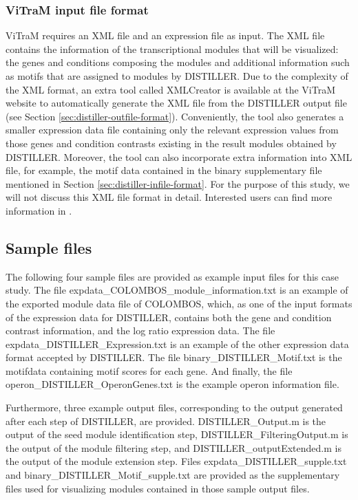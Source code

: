 \subsubsection{ViTraM input file format}
ViTraM requires an XML file and an expression file as input. The XML file contains the information of the transcriptional modules that will be visualized: the genes and conditions composing the modules and additional information such as motifs that are assigned to modules by DISTILLER. Due to the complexity of the XML format, an extra tool called XMLCreator is available at the ViTraM website to automatically generate the XML file from the DISTILLER output file (see Section \ref{sec:distiller-outfile-format}).  Conveniently, the tool also generates a smaller expression data file containing only the relevant expression values from those genes and condition contrasts existing in the result modules obtained by DISTILLER.  Moreover, the tool can also incorporate extra information into XML file, for example, the motif data contained in the binary supplementary file mentioned in Section \ref{sec:distiller-infile-format}. For the purpose of this study, we will not discuss this XML file format in detail.  Interested users can find more information in \cite{Sun2009}.



\subsection{Sample files}\label{sec:dist-sample}

The following four sample files are provided as example input files for this case study. The file expdata\_COLOMBOS\_module\_information.txt is an example of the exported module data file of COLOMBOS, which, as one of the input formats of the expression data for DISTILLER, contains both the gene and condition contrast information, and the log ratio expression data. The file expdata\_DISTILLER\_Expression.txt is an example of the other expression data format accepted by DISTILLER. The file binary\_DISTILLER\_Motif.txt is the motifdata containing motif scores for each gene. And finally, the file operon\_DISTILLER\_OperonGenes.txt is the example operon information file.

Furthermore, three example output files, corresponding to the output generated after each step of DISTILLER, are provided. DISTILLER\_Output.m is the output of the seed module identification step, DISTILLER\_FilteringOutput.m is the output of the module filtering step, and DISTILLER\_outputExtended.m is the output of the module extension step. Files expdata\_DISTILLER\_supple.txt and binary\_DISTILLER\_Motif\_supple.txt are provided as the supplementary files used for visualizing modules contained in those sample output files.

